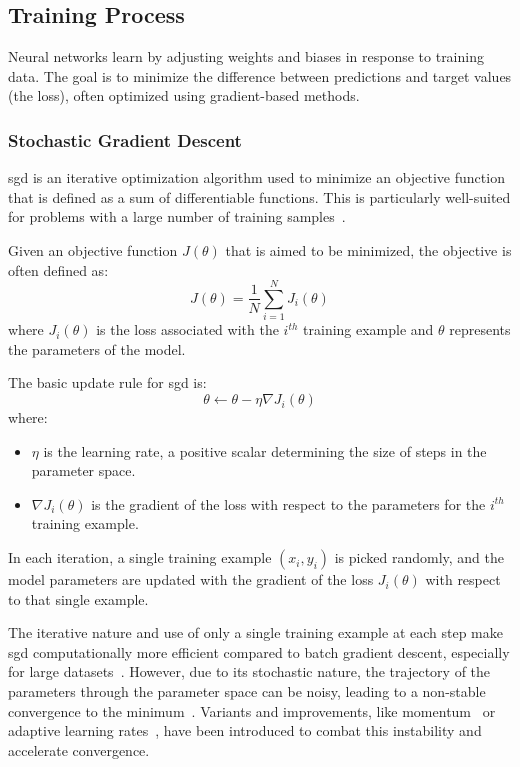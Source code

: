 \subsection{Training Process}

Neural networks learn by adjusting weights and biases in response to training data. The goal is to minimize the difference between predictions and target values (the loss), often optimized using gradient-based methods.

\subsubsection{Stochastic Gradient Descent}

\gls{sgd} is an iterative optimization algorithm used to minimize an objective function that is defined as a sum of differentiable functions. This is particularly well-suited for problems with a large number of training samples~\cite{bottou2010large}.

Given an objective function \( J(\theta) \) that is aimed to be minimized, the objective is often defined as:
\[
J(\theta) = \frac{1}{N} \sum_{i=1}^{N} J_i(\theta)
\]
where \( J_i(\theta) \) is the loss associated with the \( i^{th} \) training example and \( \theta \) represents the parameters of the model.

The basic update rule for \gls{sgd} is:
\[
\theta \leftarrow \theta - \eta \nabla J_i(\theta)
\]
where:
\begin{itemize}
	\item \( \eta \) is the learning rate, a positive scalar determining the size of steps in the parameter space.
	\item \( \nabla J_i(\theta) \) is the gradient of the loss with respect to the parameters for the \( i^{th} \) training example.
\end{itemize}

In each iteration, a single training example \( (x_i, y_i) \) is picked randomly, and the model parameters are updated with the gradient of the loss \( J_i(\theta) \) with respect to that single example.

The iterative nature and use of only a single training example at each step make \gls{sgd} computationally more efficient compared to batch gradient descent, especially for large datasets~\cite{bottou2010large}. However, due to its stochastic nature, the trajectory of the parameters through the parameter space can be noisy, leading to a non-stable convergence to the minimum~\cite{bottou2018optimization}. Variants and improvements, like momentum~\cite{sutskever2013importance} or adaptive learning rates~\cite{duchi2011adaptive}, have been introduced to combat this instability and accelerate convergence.

